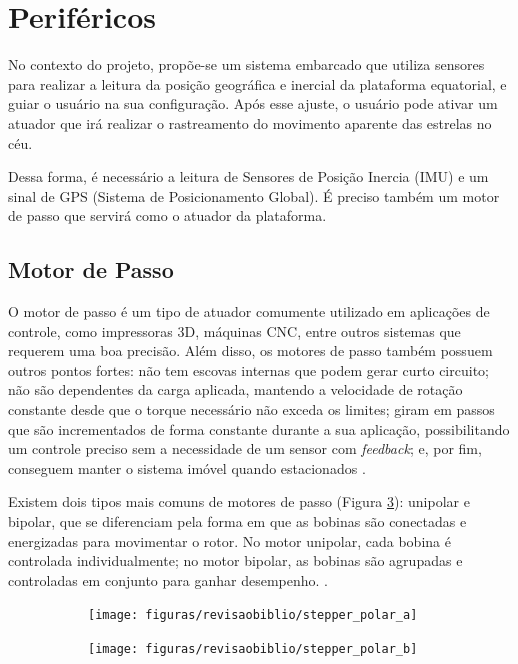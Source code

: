 \section{Periféricos}

No contexto do projeto, propõe-se um sistema embarcado que utiliza sensores para realizar a leitura da posição geográfica e inercial da plataforma equatorial, e guiar o usuário na sua configuração. Após esse ajuste, o usuário pode ativar um atuador que irá realizar o rastreamento do movimento aparente das estrelas no céu. 

Dessa forma, é necessário a leitura de Sensores de Posição Inercia (IMU) e um sinal de GPS (Sistema de Posicionamento Global). É preciso também um motor de passo que servirá como o atuador da plataforma.

\subsection{Motor de Passo}

O motor de passo é um tipo de atuador comumente utilizado em aplicações de controle, como impressoras 3D, máquinas CNC, entre outros sistemas que requerem uma boa precisão. Além disso, os motores de passo também possuem outros pontos fortes: não tem escovas internas que podem gerar curto circuito; não são dependentes da carga aplicada, mantendo a velocidade de rotação constante desde que o torque necessário não exceda os limites; giram em passos que são incrementados de forma constante durante a sua aplicação, possibilitando um controle preciso sem a necessidade de um sensor com \textit{feedback}; e, por fim, conseguem manter o sistema imóvel quando estacionados \cite{manual:stepperMicrochip}.

Existem dois tipos mais comuns de motores de passo (Figura \ref{fig:stepper_polar}): unipolar e bipolar, que se diferenciam pela forma em que as bobinas são conectadas e energizadas para movimentar o rotor. No motor unipolar, cada bobina é controlada individualmente; no motor bipolar, as bobinas são agrupadas e controladas em conjunto para ganhar desempenho. \cite{man:advancedmicrosystemStepControl}.

\begin{figure}[!htb]
	\centering
	\captionsetup[subfigure]{justification=centering}
	\caption{Modelos de motores: (a) um motor unipolar, (b) motor bipolar}
	\begin{subfigure}[b]{0.49\textwidth}
		\centering
		\texttt{[image: figuras/revisaobiblio/stepper\_polar\_a]}
		\caption{}
		\label{fig:stepper_polara}
	\end{subfigure}
	\hfill
	\begin{subfigure}[b]{0.49\textwidth}
		\centering
		\texttt{[image: figuras/revisaobiblio/stepper\_polar\_b]}
		\caption{}
		\label{fig:stepper_polarb}
	\end{subfigure}

\label{fig:stepper_polar}
\end{figure}

